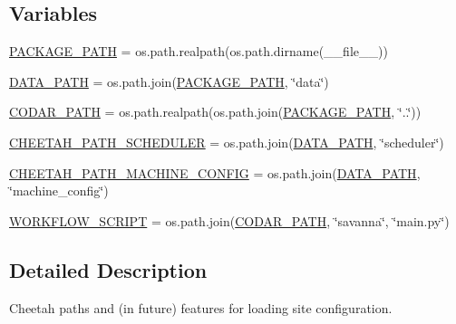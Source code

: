 \subsection*{Variables}
\begin{DoxyCompactItemize}
\item 
\hyperlink{namespacecodar_1_1cheetah_1_1config_ac3d4a0bd20d4e47ccdcd4ddb6303c1ab}{P\+A\+C\+K\+A\+G\+E\+\_\+\+P\+A\+TH} = os.\+path.\+realpath(os.\+path.\+dirname(\+\_\+\+\_\+file\+\_\+\+\_\+))
\item 
\hyperlink{namespacecodar_1_1cheetah_1_1config_a87c807c2d48e4f9bb206c1d6afde26b5}{D\+A\+T\+A\+\_\+\+P\+A\+TH} = os.\+path.\+join(\hyperlink{namespacecodar_1_1cheetah_1_1config_ac3d4a0bd20d4e47ccdcd4ddb6303c1ab}{P\+A\+C\+K\+A\+G\+E\+\_\+\+P\+A\+TH}, \char`\"{}data\char`\"{})
\item 
\hyperlink{namespacecodar_1_1cheetah_1_1config_a4ee1eac654271fe0e95d5c67599937a1}{C\+O\+D\+A\+R\+\_\+\+P\+A\+TH} = os.\+path.\+realpath(os.\+path.\+join(\hyperlink{namespacecodar_1_1cheetah_1_1config_ac3d4a0bd20d4e47ccdcd4ddb6303c1ab}{P\+A\+C\+K\+A\+G\+E\+\_\+\+P\+A\+TH}, \char`\"{}..\char`\"{}))
\item 
\hyperlink{namespacecodar_1_1cheetah_1_1config_ae6c35df28d3aa0b6f7095d2d0c7d3dc8}{C\+H\+E\+E\+T\+A\+H\+\_\+\+P\+A\+T\+H\+\_\+\+S\+C\+H\+E\+D\+U\+L\+ER} = os.\+path.\+join(\hyperlink{namespacecodar_1_1cheetah_1_1config_a87c807c2d48e4f9bb206c1d6afde26b5}{D\+A\+T\+A\+\_\+\+P\+A\+TH}, \char`\"{}scheduler\char`\"{})
\item 
\hyperlink{namespacecodar_1_1cheetah_1_1config_a5d735d6f2f43c555f2e137b38af7fc94}{C\+H\+E\+E\+T\+A\+H\+\_\+\+P\+A\+T\+H\+\_\+\+M\+A\+C\+H\+I\+N\+E\+\_\+\+C\+O\+N\+F\+IG} = os.\+path.\+join(\hyperlink{namespacecodar_1_1cheetah_1_1config_a87c807c2d48e4f9bb206c1d6afde26b5}{D\+A\+T\+A\+\_\+\+P\+A\+TH}, \char`\"{}machine\+\_\+config\char`\"{})
\item 
\hyperlink{namespacecodar_1_1cheetah_1_1config_a069e6b421b6b35917575637b5fe64409}{W\+O\+R\+K\+F\+L\+O\+W\+\_\+\+S\+C\+R\+I\+PT} = os.\+path.\+join(\hyperlink{namespacecodar_1_1cheetah_1_1config_a4ee1eac654271fe0e95d5c67599937a1}{C\+O\+D\+A\+R\+\_\+\+P\+A\+TH}, \char`\"{}savanna\char`\"{}, \char`\"{}main.\+py\char`\"{})
\end{DoxyCompactItemize}


\subsection{Detailed Description}
\begin{DoxyVerb}Cheetah paths and (in future) features for loading site configuration.
\end{DoxyVerb}
 

